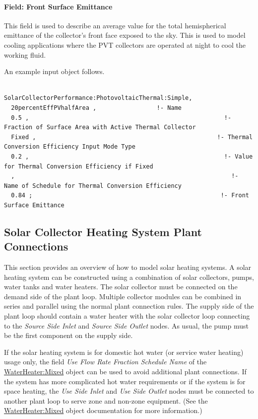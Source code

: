 \paragraph{Field: Front Surface Emittance}\label{field-front-surface-emittance}

This field is used to describe an average value for the total hemispherical emittance of the collector's front face exposed to the sky. This is used to model cooling applications where the PVT collectors are operated at night to cool the working fluid.

An example input object follows.

\begin{lstlisting}

SolarCollectorPerformance:PhotovoltaicThermal:Simple,
  20percentEffPVhalfArea ,                 !- Name
  0.5 ,                                                       !- Fraction of Surface Area with Active Thermal Collector
  Fixed ,                                                   !- Thermal Conversion Efficiency Input Mode Type
  0.2 ,                                                       !- Value for Thermal Conversion Efficiency if Fixed
  ,                                                             !- Name of Schedule for Thermal Conversion Efficiency
  0.84 ;                                                     !- Front Surface Emittance
\end{lstlisting}

\subsection{Solar Collector Heating System Plant Connections}\label{solar-collector-heating-system-plant-connections}

This section provides an overview of how to model solar heating systems. A solar heating system can be constructed using a combination of solar collectors, pumps, water tanks and water heaters. The solar collector must be connected on the demand side of the plant loop. Multiple collector modules can be combined in series and parallel using the normal plant connection rules. The supply side of the plant loop should contain a water heater with the solar collector loop connecting to the \emph{Source Side Inlet} and \emph{Source Side Outlet} nodes. As usual, the pump must be the first component on the supply side.

If the solar heating system is for domestic hot water (or service water heating) usage only, the field \emph{Use Flow Rate Fraction Schedule Name} of the \hyperref[waterheatermixed]{WaterHeater:Mixed} object can be used to avoid additional plant connections. If the system has more complicated hot water requirements or if the system is for space heating, the \emph{Use Side Inlet} and \emph{Use Side Outlet} nodes must be connected to another plant loop to serve zone and non-zone equipment. (See the \hyperref[waterheatermixed]{WaterHeater:Mixed} object documentation for more information.)

